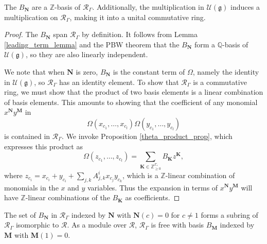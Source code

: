 \documentclass[ALCO,Unicode]{cedram}
\newcommand{\RGamma}{\mathcal{R}_{\Gamma}}
\newcommand{\RGamma}{\mathcal{R}_{\Gamma}}
\begin{document}
\begin{proposition} \label{r_gamma_is_an_algebra_prop}
The $B_{\mathbf{N}}$ are a $\mathbb{Z}$-basis of $\RGamma$. Additionally, the multiplication in $\mathcal{U}(\mathfrak{g})$ induces a multiplication on $\RGamma$, making it into a unital commutative ring.
\end{proposition}
\begin{proof}
The $B_{\mathbf{N}}$ span $\RGamma$ by definition. It follows from Lemma \ref{leading_term_lemma} and the PBW theorem that the $B_{\mathbf{N}}$ form a $\mathbb{Q}$-basis of $\mathcal{U}(\mathfrak{g})$, so they are also linearly independent.

We note that when $\mathbf{N}$ is zero, $B_{\mathbf{N}}$ is the constant term of $\Omega$, namely the identity in $\mathcal{U}(\mathfrak{g})$, so $\RGamma$ has an identity element. To show that $\RGamma$ is a commutative ring, we must show that the product of two basis elements is a linear combination of basis elements. This amounts to showing that the coefficient of any monomial $x^{\mathbf{N}} y^{\mathbf{M}}$ in 
\[
\Omega(x_{c_1}, \ldots, x_{c_l}) \Omega(y_{c_1}, \ldots, y_{c_l})
\]
is contained in $\RGamma$. We invoke Proposition \ref{theta_product_prop}, which expresses this product as 
\[
\Omega(z_{c_1}, \ldots, z_{c_l}) = \sum_{\mathbf{K} \in \mathbb{Z}_{\geq 0}^{\Gamma_*}} B_{\mathbf{K}} z^{\mathbf{K}},
\]
where $z_{c_i} = x_{c_i} + y_{c_i} + \sum_{j,k}A_{j, k}^{i}x_{c_j} y_{c_k}$, which is a $\mathbb{Z}$-linear combination of monomials in the $x$ and $y$ variables. Thus the expansion in terms of $x^{\mathbf{N}} y^{\mathbf{M}}$ will have $\mathbb{Z}$-linear combinations of the $B_{\mathbf{K}}$ as coefficients.
\end{proof}

\begin{proposition} \label{rgamma_free_over_r_prop}
The set of $B_{\mathbf{N}}$ in $\RGamma$ indexed by $\mathbf{N}$ with $\mathbf{N}(c) = 0$ for $c \neq 1$ forms a subring of $\RGamma$ isomorphic to $\mathcal{R}$. As a module over $\mathcal{R}$, $\RGamma$ is free with basis $B_{\mathbf{M}}$ indexed by $\mathbf{M}$ with $\mathbf{M}(1) = 0$.
\end{proposition}
\end{document}
